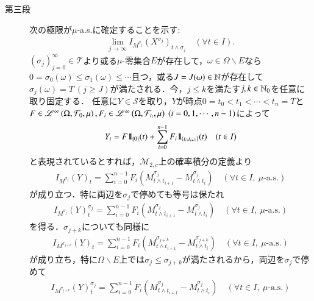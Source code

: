 \begin{prf}
\begin{description}
			\item[第三段]
				次の極限が$\mu$-a.s.に確定することを示す:
				\begin{align}
					\lim_{j \to \infty} I_{M^{\sigma_j}}(X^{\sigma_j})_{t \wedge \sigma_j}
					\quad (\forall t \in I).
				\end{align}
				$(\sigma_j)_{j=0}^{\infty} \in \mathcal{T}$より或る$\mu$-零集合$E$が存在して，$\omega \in \Omega \backslash E$なら
				$0 = \sigma_0(\omega) \leq \sigma_1(\omega) \leq \cdots$且つ，或る$J = J(\omega) \in \mathbb{N}$が存在して
				$\sigma_j(\omega) = T\ (j \geq J)$が満たされる．今，$j \leq k$を満たす$j,k \in \mathbb{N}_0$を任意に取り固定する．
				任意に$Y \in \mathcal{S}$を取り，$Y$が時点$0=t_0 < t_1 < \cdots < t_n = T$と
				$F \in \semiLp{\infty}{\Omega,\mathcal{F}_0,\mu},F_i \in \semiLp{\infty}{\Omega,\mathcal{F}_{t_i},\mu}\ (i=0,1,\cdots,n-1)$によって
				\begin{align}
					Y_t = F \mbox{1}\hspace{-0.25em}\mbox{l}_{\{0\}}(t) + \sum_{i=0}^{n-1} F_i \mbox{1}\hspace{-0.25em}\mbox{l}_{\left(t_i,t_{i+1}\right]}(t)
					\quad (t \in I)
				\end{align}
				と表現されているとすれば，$\mathcal{M}_{2,c}$上の確率積分の定義より
				\begin{align}
					I_{M^{\sigma_j}}(Y)_t = \sum_{i=0}^{n-1} F_i \left( M^{\sigma_j}_{t \wedge t_{i+1}} - M^{\sigma_j}_{t \wedge t_i} \right)
					\quad (\forall t \in I,\ \mbox{$\mu$-a.s.})
				\end{align}
				が成り立つ．特に両辺を$\sigma_j$で停めても等号は保たれ
				\begin{align}
					I_{M^{\sigma_j}}(Y)^{\sigma_j}_t = \sum_{i=0}^{n-1} F_i \left( M^{\sigma_j}_{t \wedge t_{i+1}} - M^{\sigma_j}_{t \wedge t_i} \right)
					\quad (\forall t \in I,\ \mbox{$\mu$-a.s.})
					\label{eq:thm_Ito_integral_on_M_c_loc_and_left_cont_locally_bounded_1}
				\end{align}
				を得る．$\sigma_{j+k}$についても同様に
				\begin{align}
					I_{M^{\sigma_{j+k}}}(Y)_t = \sum_{i=0}^{n-1} F_i \left( M^{\sigma_{j+k}}_{t \wedge t_{i+1}} - M^{\sigma_{j+k}}_{t \wedge t_i} \right)
					\quad (\forall t \in I,\ \mbox{$\mu$-a.s.})
				\end{align}
				が成り立ち，特に$\Omega \backslash E$上では$\sigma_j \leq \sigma_{j+k}$が満たされるから，両辺を$\sigma_j$で停めて
				\begin{align}
					I_{M^{\sigma_{j+k}}}(Y)^{\sigma_j}_t = \sum_{i=0}^{n-1} F_i \left( M^{\sigma_j}_{t \wedge t_{i+1}} - M^{\sigma_j}_{t \wedge t_i} \right)
					\quad (\forall t \in I,\ \mbox{$\mu$-a.s.})

\end{align}
\end{description}
\end{prf}
